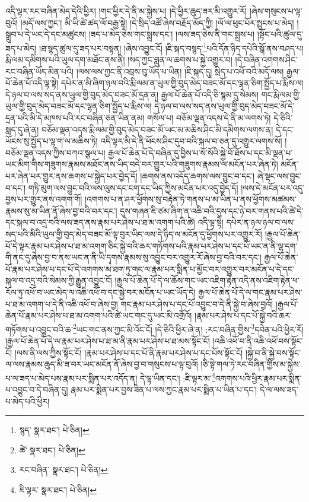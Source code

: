 འདི་ལྟར་རང་བཞིན་མེད་དེའི་ཕྱིར། །གང་ཕྱིར་དེ་ནི་མ་སྐྱེས་པ། །དེ་ཕྱིར་ཆུད་ཟར་མི་འགྱུར་རོ། །ཞེས་གསུངས་པ་ལྟ་བུའོ། །མདོ་ལས་ཀྱང་། མི་ཡི་ཚེ་ཚད་ལོ་བརྒྱ་སྟེ། །དེ་སྲིད་འཚོ་ཞེས་བརྗོད་མོད་ཀྱི། །ལོ་ལ་ཕུང་པོར་སྤུངས་པ་མེད། །སྒྲུབ་པ་དེ་ཡང་དེ་དང་མཚུངས། །ཟད་པ་མེད་ཅེས་གང་སྨྲས་དང་། །ལས་ཟད་ཅེས་ནི་གང་སྨྲས་པ། །སྟོང་པའི་ཚུལ་དུ་ཟད་པ་མེད། །ཐ་སྙད་ཚུལ་དུ་ཟད་པར་བསྟན། །ཞེས་འབྱུང་ངོ། །ཇི་སྐད་བསྙད་\footnote{སྙད་  སྣར་ཐང་།  པེ་ཅིན། }པའི་དོན་ཉིད་དཔེའི་སྒོ་ནས་བཤད་པ། རྨི་ལམ་དམིགས་པའི་ཡུལ་དག་མཐོང་ནས་ནི། །སད་ཀྱང་བླུན་ལ་ཆགས་པ་སྐྱེ་འགྱུར་བ། །དེ་བཞིན་འགགས་ཤིང་རང་བཞིན་ཡོད་མིན་པའི། །ལས་ལས་ཀྱང་ནི་འབྲས་བུ་ཡོད་པ་ཡིན། །ཇི་སྐད་དུ། སྲིད་པ་འཕོ་བའི་མདོ་ལས། རྒྱལ་པོ་ཆེན་པོ་འདི་ལྟ་སྟེ། དཔེར་ན་མི་ཞིག་ཉལ་བའི་རྨི་ལམ་ན་ཡུལ་གྱི་བུད་མེད་བཟང་མོ་དང་ལྷན་ཅིག་སྤྱོད་པ་རྨིས་ལ། དེ་ཉལ་བ་ལས་སད་ནས་ཡུལ་གྱི་བུད་མེད་བཟང་མོ་དྲན་ན། རྒྱལ་པོ་ཆེན་པོ་འདི་ཅི་སྙམ་དུ་སེམས། གང་རྨི་ལམ་གྱི་ཡུལ་གྱི་བུད་མེད་བཟང་མོ་དང་ལྷན་ཅིག་སྤྱོད་པ་རྨིས་ལ། དེ་ཉལ་བ་ལས་སད་ནས་ཡུལ་གྱི་བུད་མེད་བཟང་མོ་དེ་དྲན་པའི་མི་དེ་མཁས་པའི་རང་བཞིན་ཅན་ཡིན་ནམ། གསོལ་པ། བཅོམ་ལྡན་འདས་དེ་ནི་མ་ལགས་ཏེ། དེ་ཅིའི་སླད་དུ་ཞེ་ན། བཅོམ་ལྡན་འདས་རྨི་ལམ་གྱི་བུད་མེད་བཟང་མོ་ཡང་མ་མཆིས་ཤིང་མི་དམིགས་ལགས་ན། དེ་དང་ཡོངས་སུ་སྤྱོད་པ་ལྟ་ག་ལ་མཆིས་ཏེ། འདི་ལྟར་མི་དེ་ནི་ཕོངས་ཤིང་དུབ་བའི་སྐལ་བ་ཅན་དུ་འགྱུར་ལགས་སོ། །བཅོམ་ལྡན་འདས་ཀྱིས་བཀའ་སྩལ་པ། རྒྱལ་པོ་ཆེན་པོ་དེ་བཞིན་དུ་བྱིས་པ་སོ་སོའི་སྐྱེ་བོ་ཐོས་པ་དང་མི་ལྡན་པ་ཡང་མིག་གིས་གཟུགས་རྣམས་མཐོང་ནས་ཡིད་བདེ་བར་གྱུར་པའི་གཟུགས་རྣམས་ལ་མངོན་པར་ཞེན་ཏེ། མངོན་པར་ཞེན་པར་གྱུར་ནས་ཆགས་པ་སྐྱེད་པར་བྱེད་དོ། །ཆགས་ནས་འདོད་ཆགས་ལས་བྱུང་བ་དང་། ཞེ་སྡང་ལས་བྱུང་བ་དང་། གཏི་མུག་ལས་བྱུང་བའི་ལས་ལུས་དང་ངག་དང་ཡིད་ཀྱིས་མངོན་པར་འདུ་བྱེད་དོ། །ལས་དེ་མངོན་པར་འདུ་བྱས་པར་གྱུར་ནས་འགག་གོ། །འགགས་པ་ན་ཤར་ཕྱོགས་སུ་བརྟེན་ཏེ་གནས་པ་མ་ཡིན་པ་ནས་ཕྱོགས་མཚམས་རྣམས་སུ་མ་ཡིན་ནོ་ཞེས་བྱ་བའི་བར་དང་། དུས་གཞན་ཇི་ཙམ་ཞིག་ན་འཆི་བའི་དུས་དང་ཉེ་བར་གནས་པའི་ཚེ་དེ་དང་སྐལ་བ་འདྲ་བའི་ལས་ཟད་ནས་རྣམ་པར་ཤེས་པ་ཐ་མ་འགག་པའི་ཚེ། འདི་ལྟ་སྟེ། དཔེར་ན་ཉལ་ཉལ་བ་ལས་སད་པའི་མིའི་ཡུལ་གྱི་བུད་མེད་བཟང་མོ་ལྟ་བུར་ཡིད་ལས་དེ་ཉིད་ལ་མངོན་དུ་ཕྱོགས་པར་འགྱུར་རོ། །རྒྱལ་པོ་ཆེན་པོ་དེ་ལྟར་རྣམ་པར་ཤེས་པ་ཐ་མ་འགག་ཅིང་སྐྱེ་བའི་ཆར་གཏོགས་པའི་རྣམ་པར་ཤེས་པ་དང་པོ་ཡང་ན་ནི་ལྷ་དག་གི་ནང་དུ་ཞེས་བྱ་བ་ནས་ཡང་ན་ནི་ཡི་དྭགས་རྣམས་སུ་འབྱུང་བར་འགྱུར་རོ་ཞེས་བྱ་བའི་བར་དང་། རྒྱལ་པོ་ཆེན་པོ་རྣམ་པར་ཤེས་པ་དང་པོ་དེ་འགགས་མ་ཐག་ཏུ་གང་ལ་རྣམ་པར་སྨིན་པ་མྱོང་བར་འགྱུར་བར་མངོན་པ་དེ་དང་སྐལ་བ་འདྲ་བའི་སེམས་ཀྱི་རྒྱུན་འབྱུང་ངོ། །རྒྱལ་པོ་ཆེན་པོ་དེ་ལ་ཆོས་གང་ཡང་འཇིག་རྟེན་འདི་ནས་འཇིག་རྟེན་ཕ་རོལ་ཏུ་འཕོ་བ་ཡང་མེད་ལ་འཆི་འཕོ་བ་དང་སྐྱེ་བར་མངོན་པ་ཡང་ཡོད་དེ། རྒྱལ་པོ་ཆེན་པོ་དེ་ལ་གང་རྣམ་པར་ཤེས་པ་ཐ་མ་འགག་པ་དེ་ནི་འཆི་འཕོ་བ་ཞེས་བྱ། གང་རྣམ་པར་ཤེས་པ་དང་པོ་འབྱུང་བ་དེ་ནི་སྐྱེ་བ་ཞེས་བྱའོ། །རྒྱལ་པོ་ཆེན་པོ་རྣམ་པར་ཤེས་པ་ཐ་མ་འགག་པའི་ཚེ་ཡང་གང་དུ་ཡང་མི་འགྲོའོ། །རྣམ་པར་ཤེས་པ་དང་པོ་སྐྱེ་བའི་ཆར་གཏོགས་པ་འབྱུང་བའི་ཆ་\footnote{ཚེ་  སྣར་ཐང་།  པེ་ཅིན། }ཡང་གང་ནས་ཀྱང་མི་འོང་ངོ། །དེ་ཅིའི་ཕྱིར་ཞེ་ན། :རང་བཞིན་གྱིས་\footnote{རང་བཞིན་  སྣར་ཐང་།  པེ་ཅིན། }དབེན་པའི་ཕྱིར་རོ། །རྒྱལ་པོ་ཆེན་པོ་དེ་ལ་རྣམ་པར་ཤེས་པ་ཐ་མ་ནི་རྣམ་པར་ཤེས་པ་ཐ་མས་སྟོང་ངོ། །འཆི་འཕོ་བ་ནི་འཆི་འཕོ་བས་སྟོང་ངོ། །ལས་ནི་ལས་ཀྱིས་སྟོང་ངོ། །རྣམ་པར་ཤེས་པ་དང་པོ་ནི་རྣམ་པར་ཤེས་པ་དང་པོས་སྟོང་ངོ། །སྐྱེ་བ་ནི་སྐྱེ་བས་སྟོང་ལ་ལས་རྣམས་ཆུད་མི་ཟ་བར་ཡང་མངོན་ནོ་ཞེས་བྱ་བ་གསུངས་པ་ལྟ་བུའོ། །ཅི་སྟེ་གལ་ཏེ་རང་བཞིན་གྱིས་མ་སྐྱེས་པ་ལ་ཟད་པ་མེད་པས་རྣམ་པར་སྨིན་པར་འདོད་ན། དེ་ལྟ་ཡིན་དང་། :ཇི་ལྟར་མ་\footnote{ཇི་ལྟར་  སྣར་ཐང་།  པེ་ཅིན། }འགགས་པའི་ཕྱིར་རྣམ་པར་སྨིན་པ་འབྱུང་བ་དེ་བཞིན་དུ། རྣམ་པར་སྨིན་པར་བྱས་ཟིན་པ་ལས་ཀྱང་རྣམ་པར་སྨིན་པ་ཡིན་པ་དང་། དེ་ལ་ལས་ཟད་པ་མེད་པའི་ཕྱིར། 